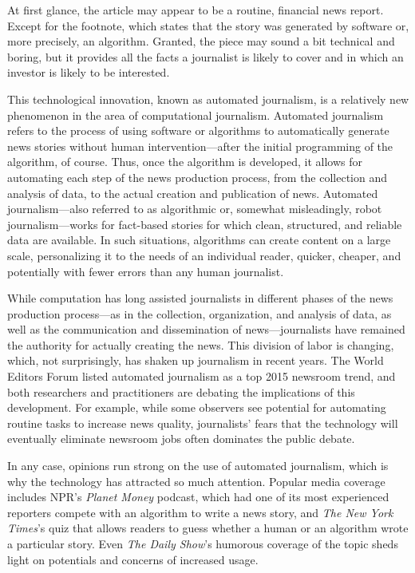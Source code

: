 \documentclass[notoc, symmetric, nobib, nols]{towcenter-guideto-book}
\begin{document}
At first glance, the article may appear to be a routine, financial news report. Except for the footnote, which states that the story was generated by software or, more precisely, an algorithm. Granted, the piece may sound a bit technical and boring, but it provides all the facts a journalist is likely to cover and in which an investor is likely to be interested. 

This technological innovation, known as automated journalism, is a relatively new phenomenon in the area of computational journalism. Automated journalism refers to the process of using software or algorithms to automatically generate news stories without human intervention---after the initial programming of the algorithm, of course. Thus, once the algorithm is developed, it allows for automating each step of the news production process, from the collection and analysis of data, to the actual creation and publication of news. Automated journalism---also referred to as algorithmic\autocite{doerr15} or, somewhat misleadingly, robot journalism\autocite{oremus15}---works for fact-based stories for which clean, structured, and reliable data are available. In such situations, algorithms can create content on a large scale, personalizing it to the needs of an individual reader, quicker, cheaper, and potentially with fewer errors than any human journalist. 

While computation has long assisted journalists in different phases of the news production process---as in the collection, organization, and analysis of data, as well as the communication and dissemination of news---journalists have remained the authority for actually creating the news. This division of labor is changing, which, not surprisingly, has shaken up journalism in recent years. The World Editors Forum listed automated journalism as a top 2015 newsroom trend,\autocite{ap15} and both researchers and practitioners are debating the implications of this development.\autocites{napoli14,diak15,anderson13} For example, while some observers see potential for automating routine tasks to increase news quality, journalists' fears that the technology will eventually eliminate newsroom jobs often dominates the public debate.\autocite{dalen12,carlson15}  

In any case, opinions run strong on the use of automated journalism, which is why the technology has attracted so much attention. Popular media coverage includes NPR's \textit{Planet Money} podcast, which had one of its most experienced reporters compete with an algorithm to write a news story,\autocite{vs15} and \textit{The New York Times}'s quiz that allows readers to guess whether a human or an algorithm wrote a particular story.\autocite{nyt15} Even \textit{The Daily Show}'s humorous coverage of the topic sheds light on potentials and concerns of increased usage\autocite{daily15}.
\end{document}
